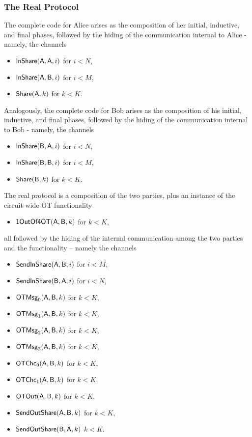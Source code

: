\subsubsection{The Real Protocol}
The complete code for Alice arises as the composition of her initial, inductive, and final phases, followed by the hiding of the communication internal to Alice - namely, the channels
\begin{itemize}
\item $\mathsf{InShare}(\mathsf{A},\mathsf{A},i)$ for $i < N$,
\item $\mathsf{InShare}(\mathsf{A},\mathsf{B},i)$ for $i < M$,
\item $\mathsf{Share}(\mathsf{A},k)$ for $k < K$.
\end{itemize}
Analogously, the complete code for Bob arises as the composition of his initial, inductive, and final phases, followed by the hiding of the communication internal to Bob - namely, the channels
\begin{itemize}
\item $\mathsf{InShare}(\mathsf{B},\mathsf{A},i)$ for $i < N$,
\item $\mathsf{InShare}(\mathsf{B},\mathsf{B},i)$ for $i < M$,
\item $\mathsf{Share}(\mathsf{B},k)$ for $k < K$.
\end{itemize}
The real protocol is a composition of the two parties, plus an instance of the circuit-wide OT functionality
\begin{itemize}
\item $\mathsf{1OutOf4OT}(\mathsf{A},\mathsf{B},k)$ for $k < K$,
\end{itemize}
all followed by the hiding of the internal communication among the two parties and the functionality -- namely the channels
\begin{itemize}
\item $\mathsf{SendInShare}(\mathsf{A},\mathsf{B},i)$ for $i < M$,
\item $\mathsf{SendInShare}(\mathsf{B},\mathsf{A},i)$ for $i < N$,
\item $\mathsf{OTMsg}_0(\mathsf{A},\mathsf{B},k)$ for $k < K$,
\item $\mathsf{OTMsg}_1(\mathsf{A},\mathsf{B},k)$ for $k < K$,
\item $\mathsf{OTMsg}_2(\mathsf{A},\mathsf{B},k)$ for $k < K$,
\item $\mathsf{OTMsg}_3(\mathsf{A},\mathsf{B},k)$ for $k < K$,
\item $\mathsf{OTChc}_0(\mathsf{A},\mathsf{B},k)$ for $k < K$,
\item $\mathsf{OTChc}_1(\mathsf{A},\mathsf{B},k)$ for $k < K$,
\item $\mathsf{OTOut}(\mathsf{A},\mathsf{B},k)$ for $k < K$,
\item $\mathsf{SendOutShare}(\mathsf{A},\mathsf{B},k)$ for $k < K$,
\item $\mathsf{SendOutShare}(\mathsf{B},\mathsf{A},k)$ $k < K$.
\end{itemize}

